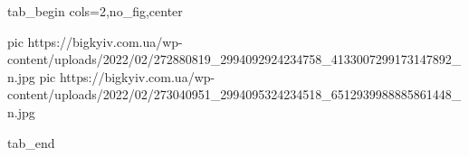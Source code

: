  
 
 
 
 


\ifcmt
  tab_begin cols=2,no_fig,center

     pic https://bigkyiv.com.ua/wp-content/uploads/2022/02/272880819_2994092924234758_4133007299173147892_n.jpg
		 pic https://bigkyiv.com.ua/wp-content/uploads/2022/02/273040951_2994095324234518_6512939988885861448_n.jpg

  tab_end
\fi
